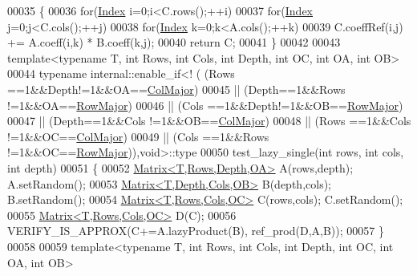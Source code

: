 \begin{DoxyCode}
00035 \{
00036   \textcolor{keywordflow}{for}(\hyperlink{namespace_eigen_a62e77e0933482dafde8fe197d9a2cfde}{Index} i=0;i<C.rows();++i)
00037     \textcolor{keywordflow}{for}(\hyperlink{namespace_eigen_a62e77e0933482dafde8fe197d9a2cfde}{Index} j=0;j<C.cols();++j)
00038       \textcolor{keywordflow}{for}(\hyperlink{namespace_eigen_a62e77e0933482dafde8fe197d9a2cfde}{Index} k=0;k<A.cols();++k)
00039         C.coeffRef(i,j) += A.coeff(i,k) * B.coeff(k,j);
00040   \textcolor{keywordflow}{return} C;
00041 \}
00042 
00043 \textcolor{keyword}{template}<\textcolor{keyword}{typename} T, \textcolor{keywordtype}{int} Rows, \textcolor{keywordtype}{int} Cols, \textcolor{keywordtype}{int} Depth, \textcolor{keywordtype}{int} OC, \textcolor{keywordtype}{int} OA, \textcolor{keywordtype}{int} OB>
00044 \textcolor{keyword}{typename} internal::enable\_if<! ( (Rows ==1&&Depth!=1&&OA==\hyperlink{group__enums_ggaacded1a18ae58b0f554751f6cdf9eb13a0cbd4bdd0abcfc0224c5fcb5e4f6669a}{ColMajor})
00045                               || (Depth==1&&Rows !=1&&OA==\hyperlink{group__enums_ggaacded1a18ae58b0f554751f6cdf9eb13acfcde9cd8677c5f7caf6bd603666aae3}{RowMajor})
00046                               || (Cols ==1&&Depth!=1&&OB==\hyperlink{group__enums_ggaacded1a18ae58b0f554751f6cdf9eb13acfcde9cd8677c5f7caf6bd603666aae3}{RowMajor})
00047                               || (Depth==1&&Cols !=1&&OB==\hyperlink{group__enums_ggaacded1a18ae58b0f554751f6cdf9eb13a0cbd4bdd0abcfc0224c5fcb5e4f6669a}{ColMajor})
00048                               || (Rows ==1&&Cols !=1&&OC==\hyperlink{group__enums_ggaacded1a18ae58b0f554751f6cdf9eb13a0cbd4bdd0abcfc0224c5fcb5e4f6669a}{ColMajor})
00049                               || (Cols ==1&&Rows !=1&&OC==\hyperlink{group__enums_ggaacded1a18ae58b0f554751f6cdf9eb13acfcde9cd8677c5f7caf6bd603666aae3}{RowMajor})),\textcolor{keywordtype}{void}>::type
00050 test\_lazy\_single(\textcolor{keywordtype}{int} rows, \textcolor{keywordtype}{int} cols, \textcolor{keywordtype}{int} depth)
00051 \{
00052   \hyperlink{group___core___module_class_eigen_1_1_matrix}{Matrix<T,Rows,Depth,OA>} A(rows,depth); A.setRandom();
00053   \hyperlink{group___core___module_class_eigen_1_1_matrix}{Matrix<T,Depth,Cols,OB>} B(depth,cols); B.setRandom();
00054   \hyperlink{group___core___module_class_eigen_1_1_matrix}{Matrix<T,Rows,Cols,OC>}  C(rows,cols);  C.setRandom();
00055   \hyperlink{group___core___module_class_eigen_1_1_matrix}{Matrix<T,Rows,Cols,OC>}  D(C);
00056   VERIFY\_IS\_APPROX(C+=A.lazyProduct(B), ref\_prod(D,A,B));
00057 \}
00058 
00059 \textcolor{keyword}{template}<\textcolor{keyword}{typename} T, \textcolor{keywordtype}{int} Rows, \textcolor{keywordtype}{int} Cols, \textcolor{keywordtype}{int} Depth, \textcolor{keywordtype}{int} OC, \textcolor{keywordtype}{int} OA, \textcolor{keywordtype}{int} OB>

\end{DoxyCode}
